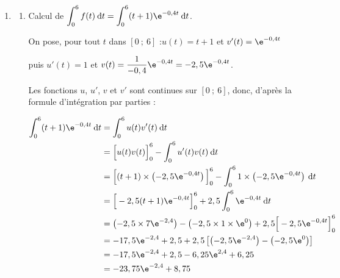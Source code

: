 \begin{enumerate}
\begin{enumerate}
Sur $[1,5~;~6]$, $f$ est continue (car dérivable) et strictement décroissante et 0,7 est une valeur intermédiaire entre $f(1,5) \approx 1,37$ et $f(6) \approx 0,63$.

D'après le corollaire aux théorème des valeurs intermédiaires appliqué aux fonctions strictement monotones, l'équation $f(t) = 0,7$ admet une unique solution $\alpha$ sur $[1,5~;~6]$.

Finalement, l'équation $f(t) = 0,7$ admet bien une unique solution sur $[0~;~6]$.

\item Par approximations successives, ou en utilisant le solveur de la calculatrice, on trouve  $\alpha \approx 5,62$ heures (on donne une approximation au centième près, car la précision attendue est à la minute, qui est un soixantième d'heure).

$0,62 \times 60 \approx 37$ minutes.

La personne est en hypoglycémie au bout de 5 heures et 37 minutes après le repas.
	\end{enumerate}

\item
	\begin{enumerate}
		\item Calcul de $\displaystyle\int_0^6 f(t)\: \text{d}t = \displaystyle\int_0^6 (t + 1)\e^{-0,4t}\: \text{d}t$.

On pose, pour tout $t$ dans $[0~;~6]$ :\quad $u(t) = t + 1$ et $v'(t) = \e^{-0,4t}$

puis $u'(t) = 1$ et $v(t) = \dfrac{1}{-0,4}\e^{-0,4t} = -2,5\e^{-0,4t}$.

Les fonctions $u$, $u'$, $v$ et $v'$ sont continues sur $[0~;~6]$, donc, d'après la formule d'intégration par parties :

$\begin{aligned} \displaystyle
\int_0^6 (t + 1)\e^{-0,4t}\: \text{d}t &=\int_{0}^{6} u(t)v'(t)\: \text{d}t\\
	&= \Big[u(t)v(t)\Big]_0^6 - \int_{0}^{6}u'(t)v(t) \: \text{d}t\\
	&= \Big[(t + 1) \times \left(-2,5\e^{-0,4t}\right)\Big]_0^6 - \int_0^6 1 \times \left(-2,5\e^{-0,4t}\right)\: \text{d}t\\
	&= \Big[-2,5(t + 1)\e^{-0,4t}\Big]_0^6 + 2,5\int_0^6 \e^{-0,4t}\: \text{d}t\\
	&= \left( -2,5 \times 7\e^{-2,4}\right) - \left(- 2,5 \times 1\times \e^{0}\right) + 2,5\Big[-2,5\e^{-0,4t}\Big]_0^6\\
	&= -17,5\e^{-2,4} + 2,5 + 2,5 \left[ \left(-2,5\e^{-2,4}\right) -\left(-2,5\e^{0}\right)\right]\\
	&= -17,5\e^{-2,4} + 2,5 - 6,25 \e^{2,4} + 6,25\\
	&= -23,75\e^{-2,4} + 8,75
\end{aligned}$


\end{enumerate}
\end{enumerate}
